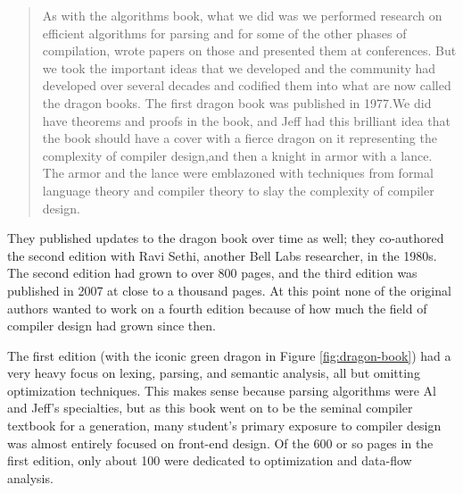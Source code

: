 \begin{quotation}
	As with the algorithms book, what we did was we performed research
	on efficient algorithms for parsing and for some of the other phases of
	compilation, wrote papers on those and presented them at conferences. But we
	took the important ideas that we developed and the community had developed over
	several decades and codified them into what are now called the dragon books. The
	first dragon book was published in 1977.We did have theorems and proofs in the
	book, and Jeff had this brilliant idea that the book should have a cover with a
	fierce dragon on it representing the complexity of compiler design,and then a
	knight in armor with a lance. The armor and the lance were emblazoned with
	techniques from formal language theory and compiler theory to slay the
	complexity of compiler design.
	\cite{aho_oral_history_2022}
\end{quotation}

They published updates to the dragon book over time as well;
they co-authored the second edition with Ravi Sethi, another Bell Labs researcher,
in the 1980s. The second edition had grown to over 800 pages, and the third edition
was published in 2007 at close to a thousand pages.
At this point none of the original authors wanted to work on a fourth edition
because of how much the field of compiler design had grown since then.

The first edition (with the iconic green dragon in Figure \ref{fig:dragon-book})
had a very heavy focus
on lexing, parsing, and semantic analysis, all but omitting optimization
techniques. This makes sense because parsing algorithms were Al and Jeff's specialties,
but as this book went on to be the seminal compiler textbook for a generation,
many student's primary exposure to compiler design was almost entirely focused on
front-end design.
Of the 600 or so pages in the first edition, only about 100 were dedicated to
optimization and data-flow analysis\cite[Chapters 12, 13, and 14]{the_dragon_book_aho_ullman_1977}.

